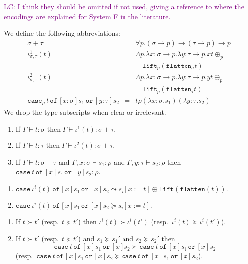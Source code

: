 \documentclass[runningheads,a4paper]{llncs}
\newcommand{\arrtype}{\rightarrow}
\newcommand{\abs}[2]{\lambda #1.#2}
\newcommand{\tabs}[2]{\Lambda #1.#2}
\newcommand{\subst}[2]{#1:=#2}
\newcommand{\flatten}{\mathtt{flatten}}
\newcommand{\lift}{\mathtt{lift}}
\newcommand{\proves}{\vdash}
\newcommand{\xcase}[4]{\mathtt{case}_{#1}\,#2\,\mathtt{of}\,#3\,\mathtt{or}\,#4}
\newcommand{\LC}[1]{\textcolor{purple}{LC: #1}}
\begin{document}
\LC{I think they should be omitted if not used, giving a reference to
  where the encodings are explained for System F in the literature.}

\begin{definition}\normalfont
  We define the following abbreviations:
  \[
  \begin{array}{rcl}
    \sigma + \tau &=& \forall p . (\sigma \arrtype p) \arrtype (\tau \arrtype p) \arrtype p \\
    \iota^1_{\sigma,\tau}(t) &=&  \tabs{p}{\abs{x:\sigma\arrtype p}{\abs{y:\tau\arrtype p}{x t \oplus_p \\&&\quad\lift_p(\flatten_\sigma t)}}} \\
    \iota^2_{\sigma,\tau}(t) &=&  \tabs{p}{\abs{x:\sigma\arrtype p}{\abs{y:\tau\arrtype p}{y t \oplus_p \\&&\quad\lift_p(\flatten_\tau t)}}} \\
    \xcase{\rho}{t}{[x:\sigma]s_1}{[y:\tau]s_2} &=& t \rho (\abs{x:\sigma}{s_1}) (\abs{y:\tau}{s_2})
  \end{array}
  \]
  We drop the type subscripts when clear or irrelevant.
\end{definition}

\begin{lemma}
  \begin{enumerate}
  \item If $\Gamma \proves t : \sigma$ then $\Gamma \proves \iota^1(t) : \sigma + \tau$.
  \item If $\Gamma \proves t : \tau$ then $\Gamma \proves \iota^2(t) : \sigma + \tau$.
  \item If $\Gamma \proves t : \sigma + \tau$ and $\Gamma,x:\sigma
    \proves s_1 : \rho$ and $\Gamma,y:\tau\proves s_2 : \rho$ then
    $\xcase{}{t}{[x]s_1}{[y]s_2} : \rho$.
  \end{enumerate}
\end{lemma}

\begin{lemma}
  \begin{enumerate}
  \item $\xcase{}{\iota^i(t)}{[x]s_1}{[x]s_2} \leadsto
    s_i[\subst{x}{t}] \oplus \lift(\flatten(t))$.
  \item $\xcase{}{\iota^i(t)}{[x]s_1}{[x]s_2} \succeq
    s_i[\subst{x}{t}]$.
  \end{enumerate}
\end{lemma}

\begin{lemma}
  \begin{enumerate}
  \item If $t \succ t'$ (resp.~$t \succeq t'$) then $\iota^i(t) \succ
    \iota^i(t')$ (resp.~$\iota^i(t) \succeq \iota^i(t')$).
  \item If $t \succ t'$ (resp.~$t \succeq t'$) and $s_1 \succeq s_1'$
    and $s_2 \succeq s_2'$ then
    \[
    \xcase{}{t}{[x]s_1}{[x]s_2} \succ \xcase{}{t}{[x]s_1}{[x]s_2}
    \]
    (resp.~$\xcase{}{t}{[x]s_1}{[x]s_2} \succeq
    \xcase{}{t}{[x]s_1}{[x]s_2}$).
  \end{enumerate}
\end{lemma}
\end{document}
